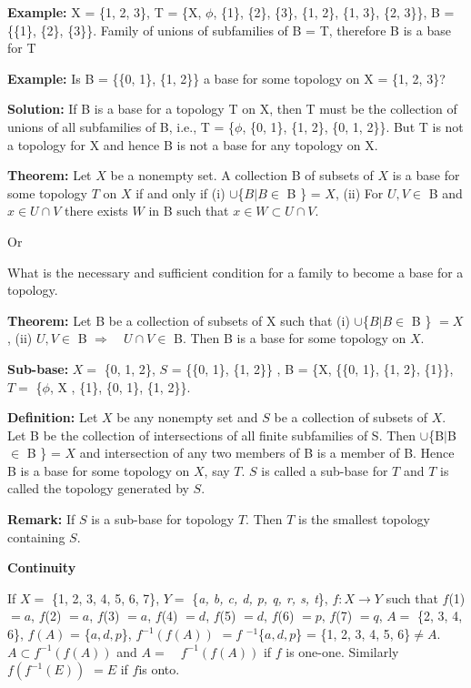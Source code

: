 \documentclass[12pt]{amsart}
\begin{document}
\textbf{Example: }X = {\{}1, 2, 3{\}}, T = {\{}X, $\phi $, {\{}1{\}}, 
{\{}2{\}}, {\{}3{\}}, {\{}1, 2{\}}, {\{}1, 3{\}}, {\{}2, 3{\}}{\}}, B = 
{\{}{\{}1{\}}, {\{}2{\}}, {\{}3{\}}{\}}. Family of unions of subfamilies of 
B = T, therefore B is a base for T 

\textbf{Example: }Is B = {\{}{\{}0, 1{\}}, {\{}1, 2{\}}{\}} a base for some 
topology on X = {\{}1, 2, 3{\}}?

\textbf{Solution:} If B is a base for a topology T on X, then T must be the 
collection of unions of all subfamilies of B, i.e., T = {\{}$\phi $, {\{}0, 
1{\}}, {\{}1, 2{\}}, {\{}0, 1, 2{\}}{\}}. But T is not a topology for X and 
hence B is not a base for any topology on X.

\textbf{Theorem:} Let $X$ be a nonempty set. A collection B of subsets of $X$ is a 
base for some topology $T$ on $X$ if and only if (i) $\cup ${\{}$B\vert B\in $ B 
{\}} = $X$, (ii) For $U, V\in $ B and $x\in U \cap V$ there exists $W$ in B such that 
$x\in W \subset U \cap V$.

Or 

What is the necessary and sufficient condition for a family to become a base 
for a topology.

\textbf{Theorem:} Let B be a collection of subsets of X such that (i) $\cup 
${\{}$B\vert B\in $ B {\}} $= X$, (ii) $U, V\in $ B $\Rightarrow  \quad U\cap V\in $ B. 
Then B is a base for some topology on $X$.

\textbf{Sub-base:} $X =$ {\{}0, 1, 2{\}}, $S$ = {\{}{\{}0, 1{\}}, {\{}1, 2{\}}{\}} , 
B = {\{}X, {\{}{\{}0, 1{\}}, {\{}1, 2{\}}, {\{}1{\}}{\}}, $T =$ {\{}$\phi $, X , 
{\{}1{\}}, {\{}0, 1{\}}, {\{}1, 2{\}}{\}}.

\textbf{Definition:} Let $X$ be any nonempty set and $S$ be a collection of 
subsets of $X$. Let B be the collection of intersections of all finite 
subfamilies of S. Then $\cup ${\{}B$\vert $B$\in $ B {\}} = $X$ and 
intersection of any two members of B is a member of B. Hence B is a base for 
some topology on $X$, say $T$. $S$ is called a sub-base for $T$ and $T$ is called the 
topology generated by $S$. 

\textbf{Remark:} If $S$ is a sub-base for topology $T$. Then $T$ is the smallest 
topology containing $S$.

\textbf{Continuity}

If $X =$ {\{}1, 2, 3, 4, 5, 6, 7{\}}, $Y =$ {\{}\textit{a, b, c, d, p, q, r, s, t}{\}}, $f : X\to Y$ such that $f $(1) $= a$, $f $(2) $= a$, $f $(3) 
$= a$, $f $(4) $= d$, $f $(5) $= d$, $f $(6) $= p$, $f $(7) $= q$, $A =$ {\{}2, 3, 4, 6{\}}, $f (A)$ = {\{}$a, d, p${\}}, $f^{-1}(f (A))$ $= f$ 
$^{-1}${\{}$a, d, p${\}} = {\{}1, 2, 3, 4, 5, 6{\}}$\ne A$. $A\subset f^{-1}(f (A))$ and 
$A = \quad f^{-1}(f (A))$ if $f$ is one-one. Similarly $f (f^{-1}(E))$ $= E$ if $f $is onto.
\end{document}
